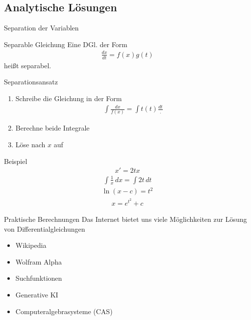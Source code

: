 \documentclass[notheorems,hidelinks,aspectratio=1610]{beamer}
\begin{document}
\subsection{Analytische Lösungen}
\frame{\subtoc}

\begin{frame}{Separation der Variablen}
  \begin{block}{Separable Gleichung}
    Eine DGl. der Form
    \begin{gather*}
      \frac{dx}{dt} = f(x)g(t)
    \end{gather*}
    heißt separabel.
  \end{block}

  \pause
  \begin{block}{Separationsansatz}
    \begin{enumerate}
    \item Schreibe die Gleichung in der Form
      \begin{gather*}
        \int \frac{dx}{f(x)} = \int t(t) \frac{dt}.
      \end{gather*}
    \item Berechne beide Integrale
    \item Löse nach $x$ auf
    \end{enumerate}
  \end{block}
\end{frame}

\begin{frame}{Beispiel}
  \begin{gather*}
    x' = 2tx
  \end{gather*}
  \pause
  \begin{gather*}
    \int \frac1x\,dx = \int 2t \,dt
  \end{gather*}
  \pause
  \begin{gather*}
    \ln(x-c) = t^2
  \end{gather*}
  \pause
  \begin{gather*}
    x = e^{t^2}+c
  \end{gather*}
\end{frame}

\begin{frame}{Praktische Berechnungen}
  Das Internet bietet uns viele Möglichkeiten zur Lösung von
  Differentialgleichungen
  \begin{itemize}
  \item Wikipedia
  \item Wolfram Alpha
  \item Suchfunktionen
  \item Generative KI
  \item Computeralgebrasysteme (CAS)
  \end{itemize}
\end{frame}
\end{document}
